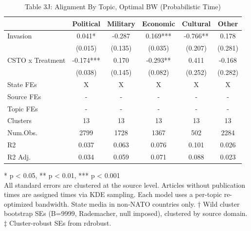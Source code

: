 \begin{table}[!t]
\caption{Table 3J: Alignment By Topic, Optimal BW (Probabilistic Time)} 
\fontsize{12.0pt}{14.4pt}\selectfont
\begin{tabular*}{\linewidth}{@{\extracolsep{\fill}}lccccc}
\toprule
  & Political & Military & Economic & Cultural & Other \\ 
\midrule\addlinespace[2.5pt]
Invasion & 0.041* & -0.287 & 0.169*** & -0.766** & 0.178 \\ 
 & (0.015) & (0.135) & (0.035) & (0.207) & (0.281) \\ 
CSTO x Treatment & -0.174*** & 0.170 & -0.293** & 0.411 & -0.168 \\ 
{} & {(0.038)} & {(0.145)} & {(0.082)} & {(0.252)} & {(0.282)} \\ 
State FEs & X & X & X & X & X \\ 
Source FEs & - & - & - & - & - \\ 
Topic FEs & - & - & - & - & - \\ 
Clusters & 13 & 13 & 13 & 13 & 13 \\ 
Num.Obs. & 2799 & 1728 & 1367 & 502 & 2284 \\ 
R2 & 0.037 & 0.063 & 0.076 & 0.101 & 0.026 \\ 
R2 Adj. & 0.034 & 0.059 & 0.071 & 0.088 & 0.023 \\ 
\bottomrule
\end{tabular*}
\begin{minipage}{\linewidth}
* p < 0.05, ** p < 0.01, *** p < 0.001\\
All standard errors are clustered at the source level. Articles without
publication times are assigned times via KDE sampling. Each model uses a
per-topic re-optimized bandwidth. State media in non-NATO countries only. † Wild
cluster bootstrap SEs (B=9999, Rademacher, null imposed), clustered by source
domain. ‡ Cluster-robust SEs from rdrobust.\\
\end{minipage}
\end{table}

